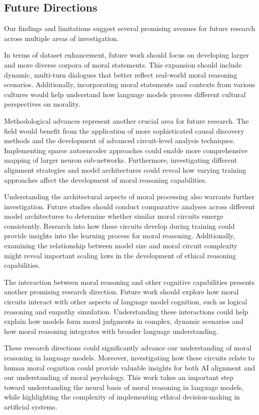 \documentclass[runninghheads]{llncs}
\begin{document}
\subsection{Future Directions}
Our findings and limitations suggest several promising avenues for future research across multiple areas of investigation.

In terms of dataset enhancement, future work should focus on developing larger and more diverse corpora of moral statements. This expansion should include dynamic, multi-turn dialogues that better reflect real-world moral reasoning scenarios. Additionally, incorporating moral statements and contexts from various cultures would help understand how language models process different cultural perspectives on morality.

Methodological advances represent another crucial area for future research. The field would benefit from the application of more sophisticated causal discovery methods and the development of advanced circuit-level analysis techniques. Implementing sparse autoencoder approaches could enable more comprehensive mapping of larger neuron sub-networks. Furthermore, investigating different alignment strategies and model architectures could reveal how varying training approaches affect the development of moral reasoning capabilities.

Understanding the architectural aspects of moral processing also warrants further investigation. Future studies should conduct comparative analyses across different model architectures to determine whether similar moral circuits emerge consistently. Research into how these circuits develop during training could provide insights into the learning process for moral reasoning. Additionally, examining the relationship between model size and moral circuit complexity might reveal important scaling laws in the development of ethical reasoning capabilities.

The interaction between moral reasoning and other cognitive capabilities presents another promising research direction. Future work should explore how moral circuits interact with other aspects of language model cognition, such as logical reasoning and empathy simulation. Understanding these interactions could help explain how models form moral judgments in complex, dynamic scenarios and how moral reasoning integrates with broader language understanding.

These research directions could significantly advance our understanding of moral reasoning in language models. Moreover, investigating how these circuits relate to human moral cognition could provide valuable insights for both AI alignment and our understanding of moral psychology. This work takes an important step toward understanding the neural basis of moral reasoning in language models, while highlighting the complexity of implementing ethical decision-making in artificial systems.
\end{document}
